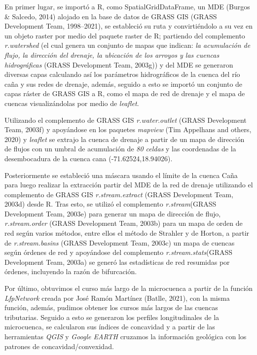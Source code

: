 \documentclass[11pt,]{article}
\begin{document}
En primer lugar, se importó a R, como SpatialGridDataFrame, un MDE
(Burgos \& Salcedo, 2014) alojado en la base de datos de GRASS GIS
(GRASS Development Team, 1998--2021), se estableció su ruta y
convirtiéndolo a su vez en un objeto raster por medio del paquete raster
de R; partiendo del complemento \emph{r.watershed} (el cual genera un
conjunto de mapas que indican: \emph{la acumulación de flujo, la
dirección del drenaje, la ubicación de los arroyos y las cuencas
hidrográficas} (GRASS Development Team, 2003g)) y del MDE se generaron
diversas capas calculando así los parámetros hidrográficos de la cuenca
del río caña y sus redes de drenaje, además, seguido a esto se importó
un conjunto de capas ráster de GRASS GIS a R, como el mapa de red de
drenaje y el mapa de cuencas visualizándolas por medio de
\emph{leaflet}.

Utilizando el complemento de GRASS GIS \emph{r.water.outlet} (GRASS
Development Team, 2003f) y apoyándose en los paquetes \emph{mapview}
(Tim Appelhans and others, 2020) y \emph{leaflet} se extrajo la cuenca
de drenaje a partir de un mapa de dirección de flujos con un umbral de
acumulación de \emph{80 celdas} y las coordenadas de la desembocadura de
la cuenca cana (-71.62524,18.94026).

Posteriormente se estableció una máscara usando el límite de la cuenca
Caña para luego realizar la extracción partir del MDE de la red de
drenaje utilizando el complemento de GRASS GIS \emph{r.stream.extract}
(GRASS Development Team, 2003d) desde R. Tras esto, se utilizó el
complemento \emph{r.stream}(GRASS Development Team, 2003e) para generar
un mapa de dirección de flujo, \emph{r.stream.order} (GRASS Development
Team, 2003b) para un mapa de orden de red según varios métodos, entre
ellos el método de Strahler y de Horton, a partir de
\emph{r.stream.basins} (GRASS Development Team, 2003c) un mapa de
cuencas según órdenes de red y apoyándose del complemento
\emph{r.stream.stats}(GRASS Development Team, 2003a) se generó las
estadísticas de red resumidas por órdenes, incluyendo la razón de
bifurcación.

Por último, obtuvimos el curso más largo de la microcuenca a partir de
la función \emph{LfpNetwork} creada por José Ramón Martínez (Batlle,
2021), con la misma función, además, pudimos obtener los cursos más
largos de las cuencas tributarias. Seguido a esto se generaron los
perfiles longitudinales de la microcuenca, se calcularon sus índices de
concavidad y a partir de las herramientas \emph{QGIS} y \emph{Google
EARTH} cruzamos la información geológica con los patrones de
concavidad/convexidad.
\end{document}
